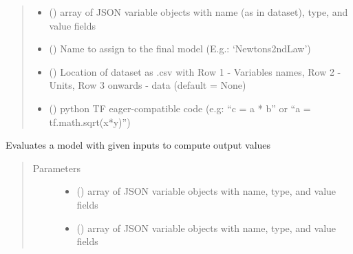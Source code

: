 \documentclass[letterpaper,10pt,english]{sphinxmanual}
\begin{document}
\begin{fulllineitems}
\begin{fulllineitems}
\begin{quote}
\begin{description}
\begin{itemize}
\item {} 
 () \textendash{} array of JSON variable objects with name (as in dataset), type, and value fields

\item {} 
 () \textendash{} Name to assign to the final model (E.g.: ‘Newtons2ndLaw’)

\item {} 
 () \textendash{} Location of dataset as .csv with Row 1 - Variables names,
Row 2 - Units, Row 3 onwards - data (default = None)

\item {} 
 () \textendash{} python TF eager-compatible code (e.g: “c = a * b” or “a = tf.math.sqrt(x*y)”)

\end{itemize}

\end{description}\end{quote}

\end{fulllineitems}


\begin{fulllineitems}
\label{\detokenize{index:kChain.kChainModel.evaluate}}
Evaluates a model with given inputs to compute output values
\begin{quote}\begin{description}
\item[{Parameters}] \leavevmode\begin{itemize}
\item {} 
 () \textendash{} array of JSON variable objects with name, type, and value fields

\item {} 
 () \textendash{} array of JSON variable objects with name, type, and value fields


\end{itemize}
\end{description}
\end{quote}
\end{fulllineitems}
\end{fulllineitems}
\end{document}
